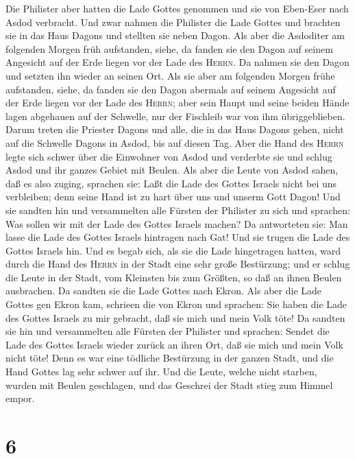  Die Philister aber hatten die Lade Gottes genommen und
sie von Eben-Eser nach Asdod verbracht.  Und zwar nahmen
die Philister die Lade Gottes und brachten sie in das Haus Dagons und
stellten sie neben Dagon.  Als aber die Asdoditer am
folgenden Morgen früh aufstanden, siehe, da fanden sie den Dagon auf
seinem Angesicht auf der Erde liegen vor der Lade des \textsc{Herrn}. Da
nahmen sie den Dagon und setzten ihn wieder an seinen Ort.
 Als sie aber am folgenden Morgen frühe aufstanden, siehe,
da fanden sie den Dagon abermals auf seinem Angesicht auf der Erde
liegen vor der Lade des \textsc{Herrn}; aber sein Haupt und seine beiden
Hände lagen abgehauen auf der Schwelle, nur der Fischleib war von ihm
übriggeblieben.  Darum treten die Priester Dagons und
alle, die in das Haus Dagons gehen, nicht auf die Schwelle Dagons in
Asdod, bis auf diesen Tag.  Aber die Hand des
\textsc{Herrn} legte sich schwer über die Einwohner von Asdod und
verderbte sie und schlug Asdod und ihr ganzes Gebiet mit Beulen.
 Als aber die Leute von Asdod sahen, daß es also zuging,
sprachen sie: Laßt die Lade des Gottes Israels nicht bei uns verbleiben;
denn seine Hand ist zu hart über uns und unserm Gott Dagon!
 Und sie sandten hin und versammelten alle Fürsten der
Philister zu sich und sprachen: Was sollen wir mit der Lade des Gottes
Israels machen? Da antworteten sie: Man lasse die Lade des Gottes
Israels hintragen nach Gat! Und sie trugen die Lade des Gottes Israels
hin.  Und es begab sich, als sie die Lade hingetragen
hatten, ward durch die Hand des \textsc{Herrn} in der Stadt eine sehr
große Bestürzung; und er schlug die Leute in der Stadt, vom Kleinsten
bis zum Größten, so daß an ihnen Beulen ausbrachen.  Da
sandten sie die Lade Gottes nach Ekron. Als aber die Lade Gottes gen
Ekron kam, schrieen die von Ekron und sprachen: Sie haben die Lade des
Gottes Israels zu mir gebracht, daß sie mich und mein Volk töte!
 Da sandten sie hin und versammelten alle Fürsten der
Philister und sprachen: Sendet die Lade des Gottes Israels wieder zurück
an ihren Ort, daß sie mich und mein Volk nicht töte! Denn es war eine
tödliche Bestürzung in der ganzen Stadt, und die Hand Gottes lag sehr
schwer auf ihr.  Und die Leute, welche nicht starben,
wurden mit Beulen geschlagen, und das Geschrei der Stadt stieg zum
Himmel empor.

\hypertarget{section-5}{%
\section{6}\label{section-5}}

